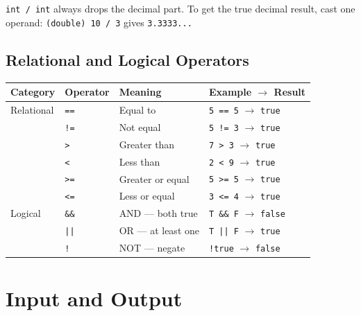\documentclass[12pt,a4paper,oneside]{book}
\begin{document}
\begin{tipbox}
\texttt{int / int} always drops the decimal part. To get the true decimal result, cast one operand: \texttt{(double) 10 / 3} gives \texttt{3.3333...}
\end{tipbox}

\subsection{Relational and Logical Operators}

\begin{center}
\begin{tabular}{llll}
\toprule
\textbf{Category} & \textbf{Operator} & \textbf{Meaning} & \textbf{Example $\to$ Result}\\
\midrule
Relational & \texttt{==}  & Equal to           & \texttt{5 == 5} $\to$ \texttt{true}\\
           & \texttt{!=}  & Not equal          & \texttt{5 != 3} $\to$ \texttt{true}\\
           & \texttt{>}   & Greater than       & \texttt{7 > 3}  $\to$ \texttt{true}\\
           & \texttt{<}   & Less than          & \texttt{2 < 9}  $\to$ \texttt{true}\\
           & \texttt{>=}  & Greater or equal   & \texttt{5 >= 5} $\to$ \texttt{true}\\
           & \texttt{<=}  & Less or equal      & \texttt{3 <= 4} $\to$ \texttt{true}\\
\midrule
Logical    & \texttt{\&\&}& AND --- both true  & \texttt{T \&\& F} $\to$ \texttt{false}\\
           & \texttt{||}  & OR  --- at least one & \texttt{T || F} $\to$ \texttt{true}\\
           & \texttt{!}   & NOT --- negate     & \texttt{!true}  $\to$ \texttt{false}\\
\bottomrule
\end{tabular}
\end{center}

\section{Input and Output}
\end{document}
